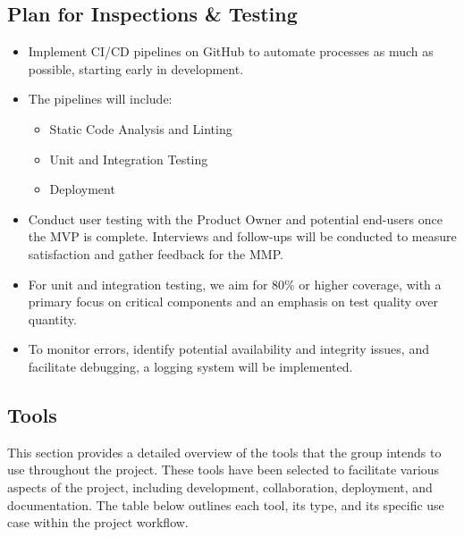 \subsection{Plan for Inspections \& Testing}\label{sec:plan_for_inspections_&_testing}

\begin{itemize}
    \item Implement CI/CD pipelines on GitHub to automate processes as much as possible, starting early in development.
    \item The pipelines will include:
    \begin{itemize}
        \item Static Code Analysis and Linting
        \item Unit and Integration Testing
        \item Deployment
    \end{itemize}
    \item Conduct user testing with the Product Owner and potential end-users once the MVP is complete. Interviews and follow-ups will be conducted to measure satisfaction and gather feedback for the MMP.
    \item For unit and integration testing, we aim for 80\% or higher coverage, with a primary focus on critical components and an emphasis on test quality over quantity.
    \item To monitor errors, identify potential availability and integrity issues, and facilitate debugging, a logging system will be implemented.
\end{itemize}

\begin{comment}
    - GitOps som et sentralt konsept
    - Bruke CI/CD Pipelines i GitHubfor å automatisere så mye som mulig
    f.eks. statiske kodesjekker og inspections, unittester og integrasjonstester, også deployment for å kunne ha manuelle inspeksjoner og tester during development.
\end{comment}

\subsection{Tools}\label{sec:tools}

This section provides a detailed overview of the tools that the group intends to use throughout the project. These tools have been selected to facilitate various aspects of the project, including development, collaboration, deployment, and documentation. The table below outlines each tool, its type, and its specific use case within the project workflow.

